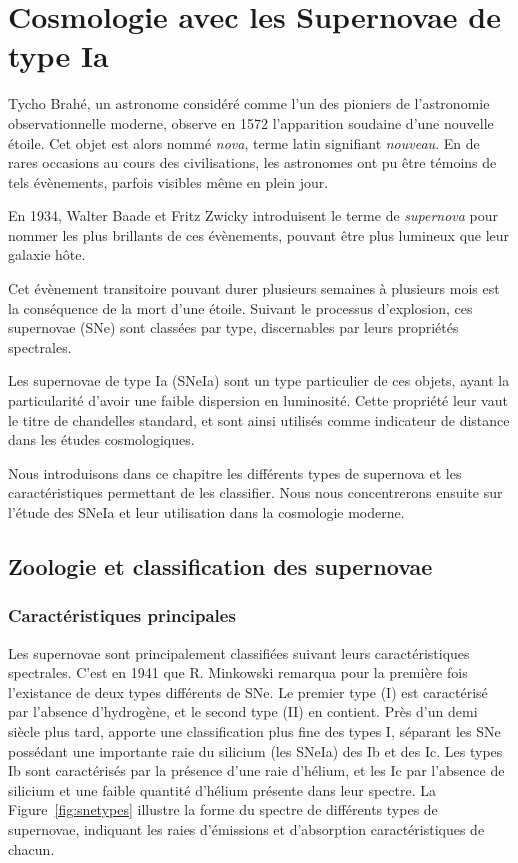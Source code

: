 \documentclass[../main/main.tex]{subfiles}
\begin{document}
\setcounter{chapter}{1}
\chapter{Cosmologie avec les Supernovae de type Ia}\label{ch:snia}

\minitoc
\vspace{2cm}

Tycho Brahé, un astronome considéré comme l'un des pioniers de l'astronomie
observationnelle moderne, observe en 1572 l'apparition soudaine d'une
nouvelle étoile. Cet objet est alors nommé \textit{nova}, terme latin
signifiant \textit{nouveau}. En de rares occasions au cours des
civilisations, les astronomes ont pu être témoins de tels évènements,
parfois visibles même en plein jour.

En 1934, Walter Baade et Fritz Zwicky introduisent le terme de
\textit{supernova} pour nommer les plus brillants de ces évènements,
pouvant être plus lumineux que leur galaxie hôte.

Cet évènement transitoire pouvant durer plusieurs semaines à plusieurs
mois est la conséquence de la mort d'une étoile. Suivant le processus
d'explosion, ces supernovae (SNe) sont classées par type, discernables
par leurs propriétés spectrales.

Les supernovae de type Ia (SNeIa) sont un type particulier de ces
objets, ayant la particularité d'avoir une faible dispersion en
luminosité. Cette propriété leur vaut le titre de chandelles standard,
et sont ainsi utilisés comme indicateur de distance dans les études
cosmologiques. 

Nous introduisons dans ce chapitre les différents types de supernova et
les caractéristiques permettant de les classifier. Nous nous
concentrerons ensuite sur l'étude des SNeIa et leur utilisation dans la
cosmologie moderne.

\newpage

\section{Zoologie et classification des supernovae}

\subsection{Caractéristiques principales}

Les supernovae sont principalement classifiées suivant leurs
caractéristiques spectrales. C'est en 1941 que R. Minkowski
\citep{Minkowski1941} remarqua pour la première fois l'existance de deux
types différents de SNe. Le premier type (I) est caractérisé par
l'absence d'hydrogène, et le second type (II) en contient.
Près d'un demi siècle plus tard, \citet{Elias1985} apporte une
classification plus fine des types I, séparant les SNe possédant une importante
raie du silicium (les SNeIa) des Ib et des Ic. Les
types Ib sont caractérisés par la présence d'une raie d'hélium, et les
Ic par l'absence de silicium et une faible quantité d'hélium présente
dans leur spectre. La Figure~\ref{fig:snetypes} illustre la forme du
spectre de différents types de supernovae, indiquant les raies
d'émissions et d'absorption caractéristiques de chacun.
\end{document}
